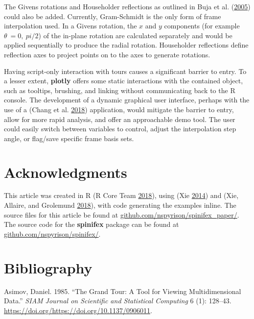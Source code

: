 The Givens rotations and Householder reflections as outlined in Buja et
al. (\protect\hyperlink{ref-buja_computational_2005}{2005}) could also
be added. Currently, Gram-Schmidt is the only form of frame
interpolation used. In a Givens rotation, the \(x\) and \(y\) components
(for example \(\theta~= 0,~pi/2\)) of the in-plane rotation are
calculated separately and would be applied sequentially to produce the
radial rotation. Householder reflections define reflection axes to
project points on to the axes to generate rotations.

Having script-only interaction with tours causes a significant barrier
to entry. To a lesser extent, \textbf{plotly} offers some static
interactions with the contained object, such as tooltips, brushing, and
linking without communicating back to the R console. The development of
a dynamic graphical user interface, perhaps with the use of a
 (Chang et al.
\protect\hyperlink{ref-chang_shiny:_2018}{2018}) application, would
mitigate the barrier to entry, allow for more rapid analysis, and offer
an approachable demo tool. The user could easily switch between
variables to control, adjust the interpolation step angle, or flag/save
specific frame basis sets.

\hypertarget{acknowledgments}{%
\section{Acknowledgments}\label{acknowledgments}}

This article was created in R (R Core Team
\protect\hyperlink{ref-r_core_team_r:_2018}{2018}), using
 (Xie \protect\hyperlink{ref-stodden_knitr:_2014}{2014})
and  (Xie, Allaire, and Grolemund
\protect\hyperlink{ref-xie_r_2018}{2018}), with code generating the
examples inline. The source files for this article be found at
\href{https://github.com/nspyrison/spinifex_paper/}{github.com/nspyrison/spinifex\_paper/}.
The source code for the \textbf{spinifex} package can be found at
\href{https://github.com/nspyrison/spinifex/}{github.com/nspyrison/spinifex/}.

\hypertarget{bibliography}{%
\section*{Bibliography}\label{bibliography}}

\hypertarget{refs}{}
\leavevmode\hypertarget{ref-asimov_grand_1985}{}%
Asimov, Daniel. 1985. ``The Grand Tour: A Tool for Viewing
Multidimensional Data.'' \emph{SIAM Journal on Scientific and
Statistical Computing} 6 (1): 128--43.
\url{https://doi.org/https://doi.org/10.1137/0906011}.

